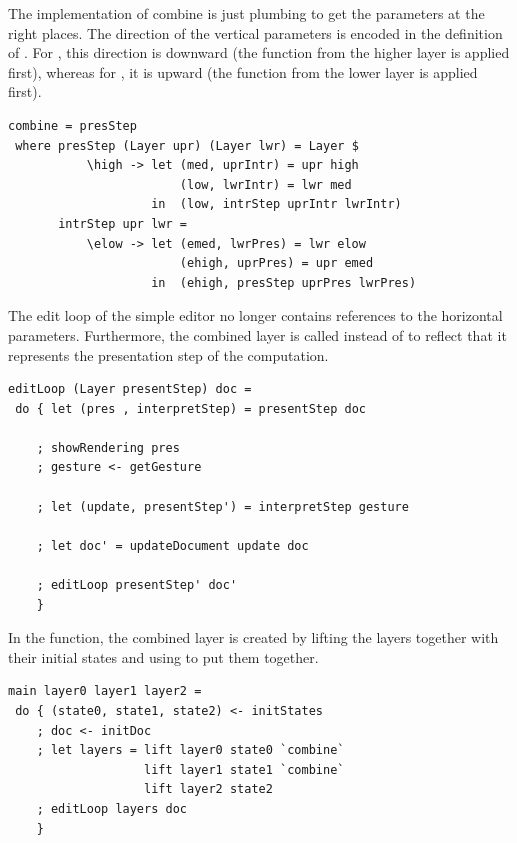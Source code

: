 \documentclass[preprint,natbib]{sigplanconf}
\begin{document}
The implementation of combine is just plumbing to get the parameters at the right places. The direction of the vertical parameters is encoded in the definition of . \bc For , this direction is downward (the function from the higher layer is applied first), whereas for , it is upward (the function from the lower layer is applied first). \ec


\begin{small}
\begin{verbatim}
combine = presStep
 where presStep (Layer upr) (Layer lwr) = Layer $ 
           \high -> let (med, uprIntr) = upr high
                        (low, lwrIntr) = lwr med
                    in  (low, intrStep uprIntr lwrIntr)
       intrStep upr lwr = 
           \elow -> let (emed, lwrPres) = lwr elow
                        (ehigh, uprPres) = upr emed
                    in  (ehigh, presStep uprPres lwrPres)
\end{verbatim}%
\end{small}



The edit loop of the simple editor no longer contains references to the horizontal parameters. Furthermore, the combined layer is called  instead of  to reflect that it represents the presentation step of the computation.

\begin{small}
\begin{verbatim}
editLoop (Layer presentStep) doc = 
 do { let (pres , interpretStep) = presentStep doc
    
    ; showRendering pres
    ; gesture <- getGesture
    
    ; let (update, presentStep') = interpretStep gesture
    
    ; let doc' = updateDocument update doc
    
    ; editLoop presentStep' doc'
    }
\end{verbatim}
\end{small}

In the  function, the combined layer is created by lifting the layers together with their initial states and using  to put them together.

\begin{small}
\begin{verbatim}
main layer0 layer1 layer2 =
 do { (state0, state1, state2) <- initStates
    ; doc <- initDoc 
    ; let layers = lift layer0 state0 `combine` 
                   lift layer1 state1 `combine`
                   lift layer2 state2
    ; editLoop layers doc
    }
\end{verbatim}
\end{small}
\end{document}
